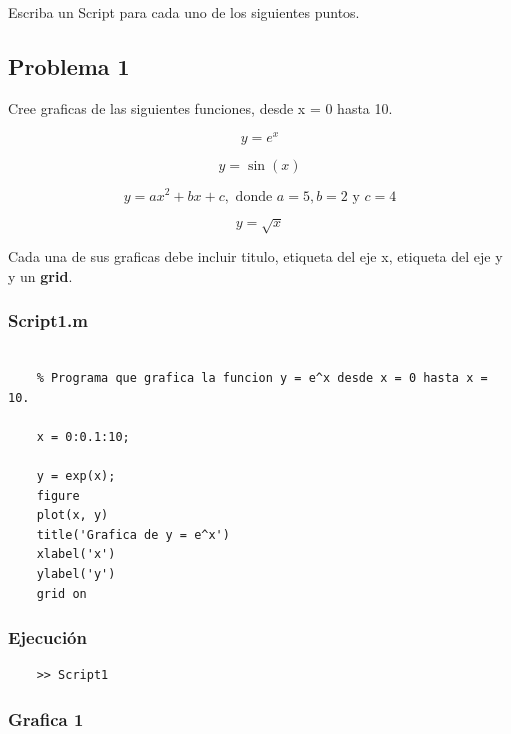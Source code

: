 \documentclass{article}
\begin{document}
	Escriba un Script para cada uno de los siguientes puntos.
	
	\subsection{Problema 1}
	
	Cree graficas de las siguientes funciones, desde x = 0 hasta 10.

	\begin{equation*}
		y = e^{x}
	\end{equation*}
	
	\begin{equation*}
		y = \sin(x)
	\end{equation*}
	
	\begin{equation*}
		y = ax^2 + bx + c, \text{ donde } a = 5, b = 2 \text{ y } c = 4
	\end{equation*}
	
	\begin{equation*}
		y = \sqrt{x}
	\end{equation*}
	
	Cada una de sus graficas debe incluir titulo, etiqueta del eje x, etiqueta del eje y y un \textbf{grid}.
	
	\newpage
	
	\subsubsection{Script1.m}
	
	\begin{lstlisting}
	
	% Programa que grafica la funcion y = e^x desde x = 0 hasta x = 10.
	
	x = 0:0.1:10;
	
	y = exp(x);
	figure
	plot(x, y)
	title('Grafica de y = e^x')
	xlabel('x')
	ylabel('y')
	grid on
	\end{lstlisting}
	
	\subsubsection{Ejecución}
	
	\begin{lstlisting}
	>> Script1
	\end{lstlisting}
	
	\subsubsection{Grafica 1}
	
\end{document}
